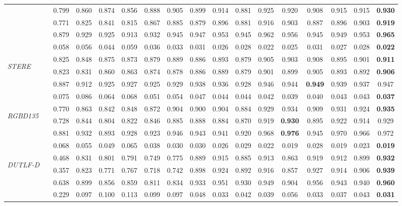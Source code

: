 \documentclass[letterpaper]{article}
\begin{document}
\begin{table*}[t!]
\begin{tabular}{lr|cccccccccccccc||c}
&  & 0.799 & 0.860 & 0.874 & 0.856 &0.888 & 0.905 & 0.899 &0.914 &0.881 &0.925 &0.920 &0.908 &0.915 &0.915  &\bf{0.930} \\
		&     & 0.771 & 0.825 & 0.841 & 0.815 &0.867 & 0.885 & 0.879 &0.896 &0.881 &0.916 &0.903 &0.887 &0.896  &0.903  &\bf{0.919} \\
		&   & 0.879 & 0.929 & 0.925 & 0.913 &0.932 & 0.945 & 0.947 &0.953 &0.945 & 0.962 &0.956 &0.945 &0.949 &0.953 &\bf {0.965} \\
		&  & 0.058 & 0.056 & 0.044 & 0.059 & 0.036 & 0.033 & 0.031 &0.026 &0.028 & 0.022 &0.025 &0.031 &0.027  &0.028 &\bf{0.022}  \\
		\midrule
		\multirow{4}{*}{\begin{sideways}\textit{STERE}\end{sideways}}
& & 0.825 & 0.848 & 0.875 & 0.873  & 0.879 & 0.889 & 0.886 &0.893  &0.879 &0.905 &0.903 &0.908 &0.895  &0.901  &\bf{0.911} \\
		&    & 0.823 & 0.831 & 0.860 & 0.863  & 0.874 & 0.878 & 0.886 &0.889  &0.879 &0.901 &0.899 &0.905 &0.893 &0.892  &\bf{0.906} \\
		&  & 0.887 & 0.912 & 0.925 & 0.927  & 0.925 & 0.929 & 0.938 &0.936 &0.928 &0.946 &0.944 &\bf{0.949} &0.939 &0.937  &0.947 \\
		&    & 0.075 & 0.086 & 0.064 & 0.068  & 0.051 & 0.054 & 0.047 &0.044  &0.044 &0.042 &0.039 &0.040 &0.043  &0.043  &\bf{0.037} \\
		\midrule
		\multirow{4}{*}{\begin{sideways}\textit{RGBD135}\end{sideways}}
&  & 0.770 & 0.863 & 0.842 & 0.848  & 0.872 & 0.904 & 0.900 &0.904 &0.884 &0.929 &0.934 &0.909 &0.931 &0.924 &\bf{0.935}  \\
		&   & 0.728 & 0.844 & 0.804 & 0.822  & 0.846 & 0.885 & 0.888 &0.884 &0.870 & 0.919 &\bf{0.930} &0.895 &0.922  &0.914  &0.929  \\
		&  & 0.881 & 0.932 & 0.893 & 0.928  & 0.923 & 0.946 & 0.943 &0.941 &0.920 &0.968 &\bf{0.976} &0.945 &0.970  &0.966  &0.972 \\
		&  & 0.068 & 0.055 & 0.049 & 0.065  & 0.038 & 0.030 & 0.030 &0.026 &0.029 & 0.022 &0.019 &0.028 &0.019 &0.023  &\bf{0.019} \\
		\midrule
\multirow{4}{*}{\begin{sideways}\textit{DUTLF-D}\end{sideways}}
&  &0.468 &0.831 &0.801 &0.791 &0.749 &0.775 &0.889 &0.915 &0.885 &0.913 &0.863 &0.919 &0.912 &0.899 &\bf{0.932}\\
		&  &0.357  &0.823 &0.771 &0.767 &0.718 &0.742 &0.898 &0.924 &0.892 &0.916 &0.857 &0.927 &0.914 & 0.906 &\bf{0.939}\\
		&  &0.638 &0.899 &0.856 &0.859 &0.811 &0.834 &0.933 &0.951 &0.930 &0.949 &0.904 &0.956 &0.943 &0.940 &\bf{0.960}\\
		&  &0.229 &0.097 &0.100  &0.113 &0.099 &0.097 &0.048 &0.033 &0.042 &0.039 &0.056 &0.033 &0.037 &0.043 &\bf{0.031}\\
		\midrule
		

\end{tabular}
\end{table*}
\end{document}
